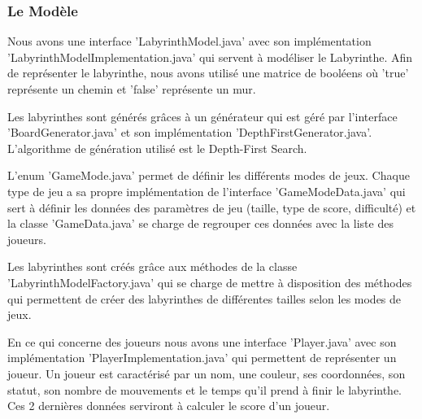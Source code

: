 \subsubsection{Le Modèle}
\label{subsubsec:modele}

Nous avons une interface 'LabyrinthModel.java' avec son implémentation
'LabyrinthModelImplementation.java' qui servent à modéliser le Labyrinthe.
Afin de représenter le labyrinthe, nous avons utilisé une matrice de booléens
où 'true' représente un chemin et 'false' représente un mur.

Les labyrinthes sont générés grâces à un générateur qui est géré par
l'interface 'BoardGenerator.java' et son implémentation 'DepthFirstGenerator.java'.
L'algorithme de génération utilisé est le Depth-First Search.

L'enum 'GameMode.java' permet de définir les différents modes de jeux.
Chaque type de jeu a sa propre implémentation de l'interface 'GameModeData.java'
qui sert à définir les données des paramètres de jeu
(taille, type de score, difficulté) et la classe 'GameData.java' se charge de
regrouper ces données avec la liste des joueurs.

Les labyrinthes sont créés grâce aux méthodes de la classe
'LabyrinthModelFactory.java' qui se charge de mettre à disposition des méthodes
qui permettent de créer des labyrinthes de différentes tailles selon les modes
de jeux.

En ce qui concerne des joueurs nous avons une interface 'Player.java' avec son
implémentation 'PlayerImplementation.java' qui permettent de représenter un
joueur. Un joueur est caractérisé par un nom, une couleur, ses coordonnées, son
statut, son nombre de mouvements et le temps qu'il prend à finir le labyrinthe.
Ces 2 dernières données serviront à calculer le score d'un joueur.

